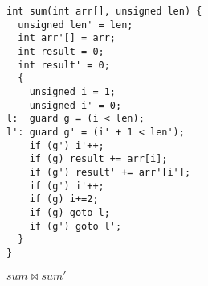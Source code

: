 \begin{figure}
\centering
\begin{lstlisting}
int sum(int arr[], unsigned len) {
  unsigned len' = len;
  int arr'[] = arr;
  int result = 0;
  int result' = 0;
  {
    unsigned i = 1;
    unsigned i' = 0;
l:  guard g = (i < len);
l': guard g' = (i' + 1 < len');
    if (g') i'++;
    if (g) result += arr[i];
    if (g') result' += arr'[i'];
    if (g') i'++;    
    if (g) i+=2;
    if (g) goto l;
    if (g') goto l';
  }
}
\end{lstlisting}
\caption{$sum \bowtie sum'$}
\end{figure} 